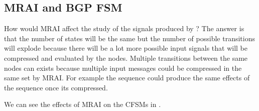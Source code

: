 \subsection{MRAI and BGP FSM}
\label{subsec:mrai_vs_bgpfsm}

How would \ac{MRAI} affect the study of the signals produced by ?
The answer is that the number of states will be the same but the number of possible
transitions will explode because there will be a lot more possible
input signals that will be compressed and evaluated by the nodes.
Multiple transitions between the same nodes can exists because multiple input
messages could be compressed in the same set by \ac{MRAI}.
For example the sequence  could produce the same effects of the sequence
 once its compressed.

We can see the effects of \ac{MRAI} on the \ac{CFSM}s in .

